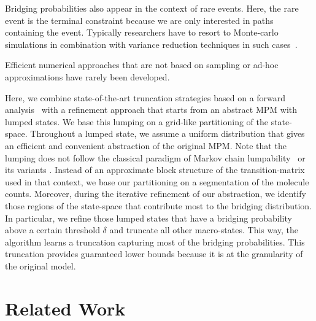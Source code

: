 
Bridging probabilities also appear in the context
of rare events.
Here, the rare event is the terminal constraint because we are only interested in paths containing the event.
Typically researchers have to resort to Monte-carlo simulations in combination with variance reduction techniques in such cases~\cite{daigle2011automated,kuwahara2008efficient}.

Efficient  numerical approaches  that are not based on sampling or ad-hoc approximations have rarely been developed.

Here, we combine state-of-the-art truncation strategies based on a forward analysis~\cite{lapin2011shave,andreychenko2011parameter} with a refinement approach that starts from an abstract \ac{MPM}
with lumped states.
We base this lumping on a grid-like partitioning of the state-space.
Throughout a lumped state, we assume a uniform distribution that gives an efficient and convenient abstraction of the original \ac{MPM}.
Note that the lumping does not follow the classical paradigm of Markov chain lumpability~\cite{buchholz1994exact}
or its variants \cite{dayar1997quasi}.
Instead of an approximate block structure of the transition-matrix used in that context, we base our partitioning on a segmentation of the molecule counts.
Moreover, during the iterative refinement of our
abstraction, we identify those regions of
the state-space that contribute most to the
bridging distribution.
In particular, we refine those lumped states that have a 
bridging probability above a certain threshold $\delta$ and
truncate all other macro-states. 
This way, the algorithm learns a truncation capturing most of the bridging probabilities. 
This truncation provides guaranteed lower bounds because it is at the granularity of the original model.

\section{Related Work}\label{sec:bridging:related}
